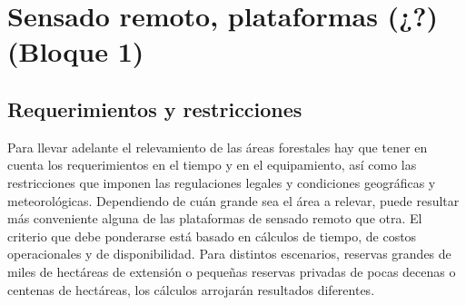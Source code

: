 \color{cyan} %
\section{Sensado remoto, plataformas (¿?) (Bloque 1)}
\subsection{Requerimientos y restricciones}
Para llevar adelante el relevamiento de las áreas forestales hay que tener en cuenta los requerimientos en el tiempo y en el equipamiento, así como las restricciones que imponen las regulaciones legales y condiciones geográficas y meteorológicas. Dependiendo de cuán grande sea el área a relevar, puede resultar más conveniente alguna de las plataformas de sensado remoto que otra. El criterio que debe ponderarse está basado en cálculos de tiempo, de costos operacionales y de disponibilidad. Para distintos escenarios, reservas grandes de miles de hectáreas de extensión o pequeñas reservas privadas de pocas decenas o centenas de hectáreas, los cálculos arrojarán resultados diferentes.
